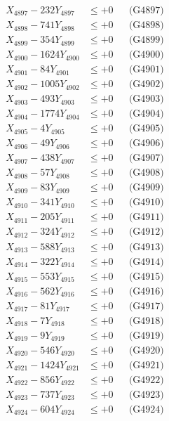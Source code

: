 \documentclass[a4paper,10pt]{article}
\begin{document}
{\begin{align}
X_{4897} - 232Y_{4897} &\leq +0 && \text{(G4897)} \\
X_{4898} - 741Y_{4898} &\leq +0 && \text{(G4898)} \\
X_{4899} - 354Y_{4899} &\leq +0 && \text{(G4899)} \\
X_{4900} - 1624Y_{4900} &\leq +0 && \text{(G4900)} \\
\allowbreak
X_{4901} - 84Y_{4901} &\leq +0 && \text{(G4901)} \\
X_{4902} - 1005Y_{4902} &\leq +0 && \text{(G4902)} \\
X_{4903} - 493Y_{4903} &\leq +0 && \text{(G4903)} \\
X_{4904} - 1774Y_{4904} &\leq +0 && \text{(G4904)} \\
X_{4905} - 4Y_{4905} &\leq +0 && \text{(G4905)} \\
X_{4906} - 49Y_{4906} &\leq +0 && \text{(G4906)} \\
X_{4907} - 438Y_{4907} &\leq +0 && \text{(G4907)} \\
X_{4908} - 57Y_{4908} &\leq +0 && \text{(G4908)} \\
X_{4909} - 83Y_{4909} &\leq +0 && \text{(G4909)} \\
X_{4910} - 341Y_{4910} &\leq +0 && \text{(G4910)} \\
\allowbreak
X_{4911} - 205Y_{4911} &\leq +0 && \text{(G4911)} \\
X_{4912} - 324Y_{4912} &\leq +0 && \text{(G4912)} \\
X_{4913} - 588Y_{4913} &\leq +0 && \text{(G4913)} \\
X_{4914} - 322Y_{4914} &\leq +0 && \text{(G4914)} \\
X_{4915} - 553Y_{4915} &\leq +0 && \text{(G4915)} \\
X_{4916} - 562Y_{4916} &\leq +0 && \text{(G4916)} \\
X_{4917} - 81Y_{4917} &\leq +0 && \text{(G4917)} \\
X_{4918} - 7Y_{4918} &\leq +0 && \text{(G4918)} \\
X_{4919} - 9Y_{4919} &\leq +0 && \text{(G4919)} \\
X_{4920} - 546Y_{4920} &\leq +0 && \text{(G4920)} \\
\allowbreak
X_{4921} - 1424Y_{4921} &\leq +0 && \text{(G4921)} \\
X_{4922} - 856Y_{4922} &\leq +0 && \text{(G4922)} \\
X_{4923} - 737Y_{4923} &\leq +0 && \text{(G4923)} \\
X_{4924} - 604Y_{4924} &\leq +0 && \text{(G4924)} \\

\end{align}}
\end{document}
